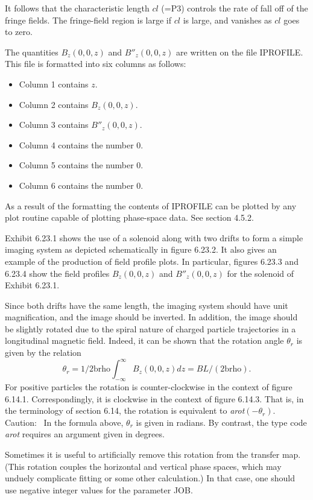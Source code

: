 It follows that the characteristic length $cl$ (=P3) controls the rate of fall off of the fringe fields.  The fringe-field region is large if $cl$ is large, and vanishes as $cl$ goes to zero.

The quantities $B_z(0,0,z)$ and $B''_z(0,0,z)$ are written on the file IPROFILE\@.  This file is formatted into six columns as follows:
\begin{itemize}
  \item Column 1 contains $z$.
  \item Column 2 contains $B_z(0,0,z)$.
  \item Column 3 contains $B''_z(0,0,z)$.
  \item Column 4 contains the number 0.
  \item Column 5 contains the number 0.
  \item Column 6 contains the number 0.
\end{itemize}
As a result of the formatting the contents of IPROFILE can be plotted by any plot routine capable of plotting \Mary phase-space data.  See section 4.5.2.

Exhibit 6.23.1 shows the use of a solenoid along with two drifts to form
a simple imaging system as depicted schematically in figure 6.23.2.  It
also gives an example of the production of field profile plots.  In
particular, figures 6.23.3 and 6.23.4 show the field profiles $B_z(0,0,z)$ and $B''_z(0,0,z)$ for the solenoid of Exhibit 6.23.1.  

Since both drifts have the same length, the imaging system should have unit magnification, and the image should be inverted.  In addition, the image should be slightly rotated due to the spiral nature of charged particle trajectories in a longitudinal magnetic field.  Indeed, it can be shown that the rotation angle $\theta_r$ is given by the relation
\[  \theta_r = 1/2 \mbox{brho} \int_{-\infty}^{\infty} B_z(0,0,z) dz =
BL/(2 \mbox{brho}).  \]
For positive particles the rotation is counter-clockwise in the context
of figure 6.14.1.  Correspondingly, it is clockwise in the context of
figure 6.14.3.  That is, in the terminology  of section 6.14, the rotation
is equivalent to {\em arot}$(-\theta_r)$.  Caution: \ In the formula
above, $\theta_r$ is given in radians.  By contrast, the type code {\em
arot} requires an argument given in degrees.

Sometimes it is useful to artificially remove this rotation from the
transfer map.  (This rotation couples the horizontal and vertical phase
spaces, which may unduely complicate fitting or some other calculation.)
In that case, one should use negative integer values for the parameter JOB.


